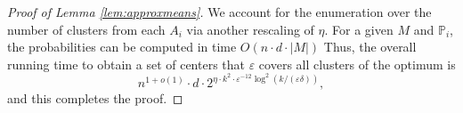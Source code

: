 \documentclass[11pt]{article}
\begin{document}
\begin{proof}[Proof of Lemma \ref{lem:approxmeans}]
We account for the enumeration over the number of clusters from each $A_i$ via another rescaling of $\eta$.
For a given $M$ and $\mathbb{P}_i$, the probabilities can be computed in time $O(n\cdot d\cdot |M|)$
Thus, the overall running time to obtain a set of centers that $\varepsilon$ covers all clusters of the optimum is
$$n^{1+o(1)} \cdot d \cdot 2^{\eta\cdot k^2 \cdot \varepsilon^{-12} \log^2(k/(\varepsilon\delta))},$$
and this completes the proof.

\end{proof}
\end{document}
